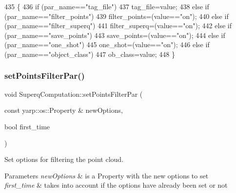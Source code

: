 \begin{DoxyCode}
435 \{
436     \textcolor{keywordflow}{if} (par\_name==\textcolor{stringliteral}{"tag\_file"})
437         tag_file=value;
438     \textcolor{keywordflow}{else} \textcolor{keywordflow}{if} (par\_name==\textcolor{stringliteral}{"filter\_points"})
439         filter_points=(value==\textcolor{stringliteral}{"on"});
440     \textcolor{keywordflow}{else} \textcolor{keywordflow}{if} (par\_name==\textcolor{stringliteral}{"filter\_superq"})
441         filter_superq=(value==\textcolor{stringliteral}{"on"});
442     \textcolor{keywordflow}{else} \textcolor{keywordflow}{if} (par\_name==\textcolor{stringliteral}{"save\_points"})
443         save_points=(value==\textcolor{stringliteral}{"on"});
444     \textcolor{keywordflow}{else} \textcolor{keywordflow}{if} (par\_name==\textcolor{stringliteral}{"one\_shot"})
445         one\_shot=(value==\textcolor{stringliteral}{"on"});
446     \textcolor{keywordflow}{else} \textcolor{keywordflow}{if} (par\_name==\textcolor{stringliteral}{"object\_class"})
447         ob_class=value;
448 \}
\end{DoxyCode}
\mbox{\label{classSuperqComputation_a4f841a006336a06d0a349f8a57707524}} 
\subsubsection{\texorpdfstring{set\+Points\+Filter\+Par()}{setPointsFilterPar()}}
{\footnotesize\ttfamily void Superq\+Computation\+::set\+Points\+Filter\+Par (\begin{DoxyParamCaption}\item[{const yarp\+::os\+::\+Property \&}]{new\+Options,  }\item[{bool}]{first\+\_\+time }\end{DoxyParamCaption})}



Set options for filtering the point cloud. 


\begin{DoxyParams}{Parameters}
{\em new\+Options} & is a Property with the new options to set \\
\hline
{\em first\+\_\+time} & takes into account if the options have already been set or not \\
\hline
\end{DoxyParams}


